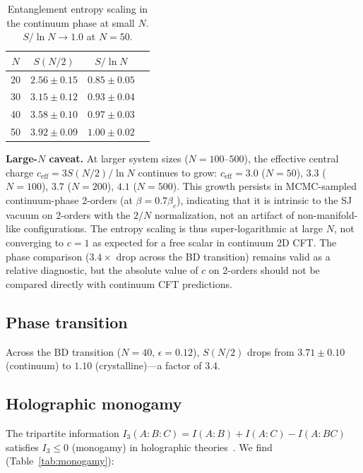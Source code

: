 \documentclass[aps,prd,twocolumn,superscriptaddress,nofootinbib]{revtex4-2}
\begin{document}
\begin{table}[h]
\centering
\begin{tabular}{cccc}
\toprule
$N$ & $S(N/2)$ & $S/\ln N$ \\
\midrule
20 & $2.56 \pm 0.15$ & $0.85 \pm 0.05$ \\
30 & $3.15 \pm 0.12$ & $0.93 \pm 0.04$ \\
40 & $3.58 \pm 0.10$ & $0.97 \pm 0.03$ \\
50 & $3.92 \pm 0.09$ & $1.00 \pm 0.02$ \\
\bottomrule
\end{tabular}
\caption{Entanglement entropy scaling in the continuum phase at small $N$. $S/\ln N \to 1.0$ at $N = 50$.}
\label{tab:scaling}
\end{table}

\textbf{Large-$N$ caveat.} At larger system sizes ($N = 100$--$500$), the effective central charge $c_{\mathrm{eff}} = 3S(N/2)/\ln N$ continues to grow: $c_{\mathrm{eff}} = 3.0$ ($N = 50$), $3.3$ ($N = 100$), $3.7$ ($N = 200$), $4.1$ ($N = 500$). This growth persists in MCMC-sampled continuum-phase 2-orders (at $\beta = 0.7\beta_c$), indicating that it is intrinsic to the SJ vacuum on 2-orders with the $2/N$ normalization, not an artifact of non-manifold-like configurations. The entropy scaling is thus super-logarithmic at large $N$, not converging to $c = 1$ as expected for a free scalar in continuum 2D CFT. The phase comparison ($3.4\times$ drop across the BD transition) remains valid as a relative diagnostic, but the absolute value of $c$ on 2-orders should not be compared directly with continuum CFT predictions.

\subsection{Phase transition}

Across the BD transition ($N = 40$, $\epsilon = 0.12$), $S(N/2)$ drops from $3.71 \pm 0.10$ (continuum) to $1.10$ (crystalline)---a factor of 3.4.

\subsection{Holographic monogamy}

The tripartite information $I_3(A{:}B{:}C) = I(A{:}B) + I(A{:}C) - I(A{:}BC)$ satisfies $I_3 \leq 0$ (monogamy) in holographic theories~\cite{hayden2013}. We find (Table~\ref{tab:monogamy}):
\end{document}

